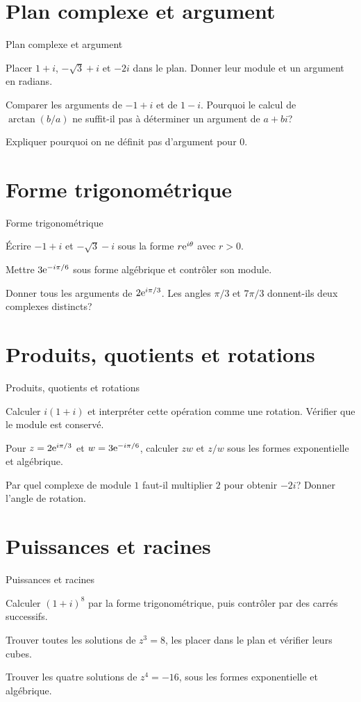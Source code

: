 \section{Plan complexe et argument}
\label{workbook:section:complexes.04}
\begin{exerciseblock}{Plan complexe et argument}
\item Placer $1+i$, $-\sqrt3+i$ et $-2i$ dans le plan. Donner leur module et un argument en radians.
\item Comparer les arguments de $-1+i$ et de $1-i$. Pourquoi le calcul de $\arctan(b/a)$ ne suffit-il pas à déterminer un argument de $a+bi$?
\item Expliquer pourquoi on ne définit pas d'argument pour $0$.
\end{exerciseblock}

\section{Forme trigonométrique}
\label{workbook:section:complexes.05}
\begin{exerciseblock}{Forme trigonométrique}
\item Écrire $-1+i$ et $-\sqrt3-i$ sous la forme $r\mathrm e^{i\theta}$ avec $r>0$.
\item Mettre $3\mathrm e^{-i\pi/6}$ sous forme algébrique et contrôler son module.
\item Donner tous les arguments de $2\mathrm e^{i\pi/3}$. Les angles $\pi/3$ et $7\pi/3$ donnent-ils deux complexes distincts?
\end{exerciseblock}

\section{Produits, quotients et rotations}
\label{workbook:section:complexes.06}
\begin{exerciseblock}{Produits, quotients et rotations}
\item Calculer $i(1+i)$ et interpréter cette opération comme une rotation. Vérifier que le module est conservé.
\item Pour $z=2\mathrm e^{i\pi/3}$ et $w=3\mathrm e^{-i\pi/6}$, calculer $zw$ et $z/w$ sous les formes exponentielle et algébrique.
\item Par quel complexe de module $1$ faut-il multiplier $2$ pour obtenir $-2i$? Donner l'angle de rotation.
\end{exerciseblock}

\section{Puissances et racines}
\label{workbook:section:complexes.07}
\begin{exerciseblock}{Puissances et racines}
\item Calculer $(1+i)^8$ par la forme trigonométrique, puis contrôler par des carrés successifs.
\item Trouver toutes les solutions de $z^3=8$, les placer dans le plan et vérifier leurs cubes.
\item Trouver les quatre solutions de $z^4=-16$, sous les formes exponentielle et algébrique.
\end{exerciseblock}


